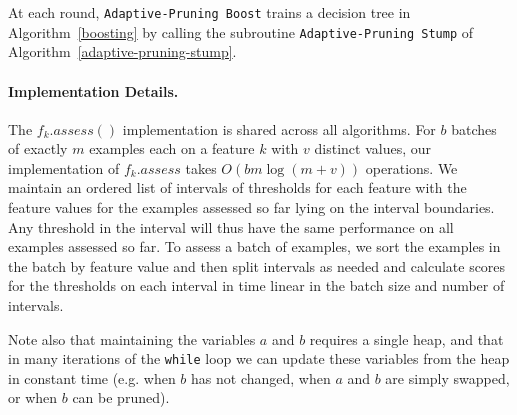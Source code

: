 At each round, \texttt{Adaptive-Pruning Boost} trains a decision tree
in Algorithm~\ref{boosting} by calling the subroutine
\texttt{Adaptive-Pruning Stump} of Algorithm~\ref{adaptive-pruning-stump}.

\paragraph{Implementation Details.}
The $f_k.assess()$ implementation is shared across all algorithms.
 For $b$ batches of exactly $m$ examples each on a feature $k$ with $v$ distinct
 values, our implementation of $f_k.assess$ takes $O(b m \log (m + v))$
 operations.
 We maintain an ordered list of intervals of thresholds for each feature with
 the feature values for the examples assessed so far lying on the interval
 boundaries.
 Any threshold in the interval will thus have the same performance on all
 examples assessed so far.
 To assess a batch of examples, we sort the examples in the batch by feature
 value and then split intervals as needed and calculate scores for the
 thresholds on each interval in time linear in the batch size and number of
 intervals.

Note also that maintaining the variables $a$ and $b$ requires a
single heap, and that in many iterations of the \texttt{while} loop we can
update these variables from the heap in constant time
(e.g. when $b$ has not changed, when $a$ and $b$ are simply swapped,
or when $b$ can be pruned).